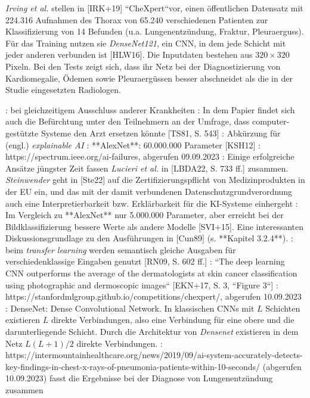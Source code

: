 \textit{Irving et al.} stellen in [IRK+19] ``CheXpert``\footnotemark[23] vor, einen öffentlichen Datensatz mit 224.316 Aufnahmen des Thorax von 65.240 verschiedenen Patienten zur Klassifizierung von 14 Befunden (u.a. Lungenentzündung, Fraktur, Pleuraerguss). Für das Training nutzen sie \textit{DenseNet121}, ein CNN, in dem jede Schicht mit jeder anderen verbunden ist [HLW16]\footnotemark[24]. Die Inputdaten bestehen aus $320 \times 320$ Pixeln. Bei den Tests zeigt sich, dass ihr Netz bei der Diagnostizierung von Kardiomegalie, Ödemen sowie Pleuraergüssen besser abschneidet als die in der Studie eingesetzten Radiologen\footnotemark[25].


\footnotemark[14]: bei gleichzeitigem Ausschluss anderer Krankheiten
\footnotemark[15]: In dem Papier findet sich auch die Befürchtung unter den Teilnehmern an der Umfrage, dass computer-gestützte Systeme den Arzt ersetzen könnte [TS81, S. 543]
\footnotemark[16]: Abkürzung für (engl.) \textit{explainable AI}
\footnotemark[17]: **AlexNet**: 60.000.000 Parameter [KSH12]
\footnotemark[18]: https://spectrum.ieee.org/ai-failures, abgerufen 09.09.2023
\footnotemark[19]: Einige erfolgreiche Ansätze jüngster Zeit fassen \textit{Lucieri et al.} in [LBDA22, S. 733 ff.] zusammen. \textit{Steinwender} geht in [Ste22] auf die Zertifizierungspflicht von Medizinprodukten in der EU ein, und das mit der damit verbundenen Datenschutzgrundverordnung auch eine Interpretierbarkeit bzw. Erklärbarkeit für die KI-Systeme einhergeht
\footnotemark[20]: Im Vergleich zu **AlexNet** nur 5.000.000 Parameter, aber erreicht bei der Bildklassifizierung bessere Werte als andere Modelle [SVI+15]. Eine interessanten Diskussionsgrundlage zu den Ausführungen in [Cun89] (s. **Kapitel 3.2.4**).
\footnotemark[21]: beim \textit{transfer learning} werden semantisch gleiche Ausgaben für verschiedenklassige Eingaben genutzt [RN09, S. 602 ff.]
\footnotemark[22]: ``The deep learning CNN outperforms the average of the dermatologists at skin cancer classification using photographic and
dermoscopic images`` [EKN+17, S. 3, ``Figure 3``]
\footnotemark[23]: https://stanfordmlgroup.github.io/competitions/chexpert/, abgerufen 10.09.2023
\footnotemark[24]: DenseNet: Dense Convolutional Network. In klassischen CNNs mit $L$ Schichten existieren $L$ direkte Verbindungen, also eine Verbindung für eine obere und die darunterliegende Schicht. Durch die Architektur von \textit{Densenet} existieren in dem Netz $L(L +1)/2$ direkte Verbindungen.
\footnotemark[25]: https://intermountainhealthcare.org/news/2019/09/ai-system-accurately-detects-key-findings-in-chest-x-rays-of-pneumonia-patients-within-10-seconds/ (abgerufen 10.09.2023) fasst die Ergebnisse bei der Diagnose von Lungenentzündung zusammen

